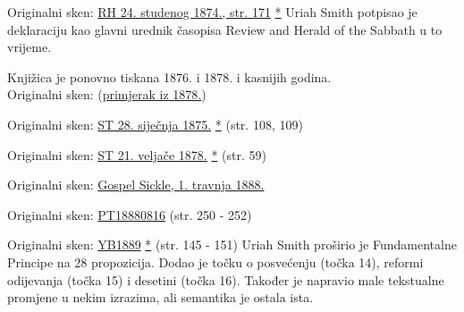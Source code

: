 
Originalni sken: \href{https://documents.adventistarchives.org/Periodicals/RH/RH18741124-V44-22.pdf}{RH 24. studenog 1874., str. 171} \href{https://forgotten-pillar.s3.us-east-2.amazonaws.com/RH18741124-V44-22.pdf}{*} Uriah Smith potpisao je deklaraciju kao glavni urednik časopisa Review and Herald of the Sabbath u to vrijeme.


Knjižica je ponovno tiskana 1876. i 1878. i kasnijih godina. \\
Originalni sken: (\href{https://adventistdigitallibrary.org/islandora/object/adl%3A22250872?solr_nav%5Bid%5D=a09d3902c2540c98eb7f&solr_nav%5Bpage%5D=56&solr_nav%5Boffset%5D=3}{primjerak iz 1878.})


Originalni sken: \href{https://documents.adventistarchives.org/Periodicals/ST/ST18750128-V01-14.pdf#search=ST18750128}{ST 28. siječnja 1875.} \href{https://forgotten-pillar.s3.us-east-2.amazonaws.com/ST18750128-V01-14.pdf}{*} (str. 108, 109)


Originalni sken: \href{https://documents.adventistarchives.org/Periodicals/ST/ST18780221-V04-08.pdf#search=%22As%20already%20stated%2C%20S%2E%20D%2E%20Adventists%22}{ST 21. veljače 1878.} \href{https://forgotten-pillar.s3.us-east-2.amazonaws.com/ST18780221-V04-08.pdf}{*} (str. 59)


Originalni sken: \href{https://adventistdigitallibrary.org/adl-410336/gospel-sickle-april-1-1888?view_only=true&solr_nav%5Bid%5D=ff4d7f3f77b9bdf9e9ac&solr_nav%5Bpage%5D=0&solr_nav%5Boffset%5D=6}{Gospel Sickle, 1. travnja 1888.}


Originalni sken: \href{https://adventistdigitallibrary.org/adl-402854/present-truth-august-16-1888?view_only=true&solr_nav%5Bid%5D=ff4d7f3f77b9bdf9e9ac&solr_nav%5Bpage%5D=0&solr_nav%5Boffset%5D=13}{PT18880816} (str. 250 - 252)


Originalni sken: \href{https://documents.adventistarchives.org/Yearbooks/YB1889.pdf#search=Yearbook%201889}{YB1889} \href{https://forgotten-pillar.s3.us-east-2.amazonaws.com/YB1889.pdf}{*} (str. 145 - 151) Uriah Smith proširio je Fundamentalne Principe na 28 propozicija. Dodao je točku o posvećenju (točka 14), reformi odijevanja (točka 15) i desetini (točka 16). Također je napravio male tekstualne promjene u nekim izrazima, ali semantika je ostala ista.

